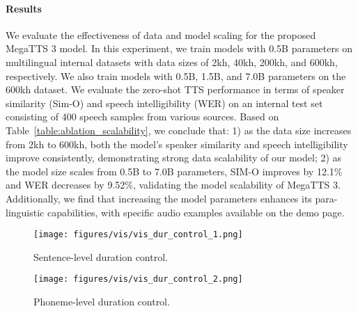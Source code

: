 \paragraph{Results} We evaluate the effectiveness of data and model scaling for the proposed MegaTTS 3 model. In this experiment, we train models with 0.5B parameters on multilingual internal datasets with data sizes of 2kh, 40kh, 200kh, and 600kh, respectively. We also train models with 0.5B, 1.5B, and 7.0B parameters on the 600kh dataset. We evaluate the zero-shot TTS performance in terms of speaker similarity (Sim-O) and speech intelligibility (WER) on an internal test set consisting of 400 speech samples from various sources. Based on Table~\ref{table:ablation_scalability}, we conclude that: 1) as the data size increases from 2kh to 600kh, both the model's speaker similarity and speech intelligibility improve consistently, demonstrating strong data scalability of our model; 2) as the model size scales from 0.5B to 7.0B parameters, SIM-O improves by 12.1\% and WER decreases by 9.52\%, validating the model scalability of MegaTTS 3. Additionally, we find that increasing the model parameters enhances its para-linguistic capabilities, with specific audio examples available on the demo page.


\begin{figure*}[!ht]
\centering
\begin{minipage}{0.49\linewidth}
    \centering
\texttt{[image: figures/vis/vis\_dur\_control\_1.png]}
\caption{Sentence-level duration control.}
\label{app:vis_sent_dur_control}
\end{minipage}
\centering
\begin{minipage}{0.49\linewidth}
    \centering
    \texttt{[image: figures/vis/vis\_dur\_control\_2.png]}
    \caption{Phoneme-level duration control.}
    \label{app:vis_ph_dur_control}
\end{minipage}
\centering
\end{figure*}

